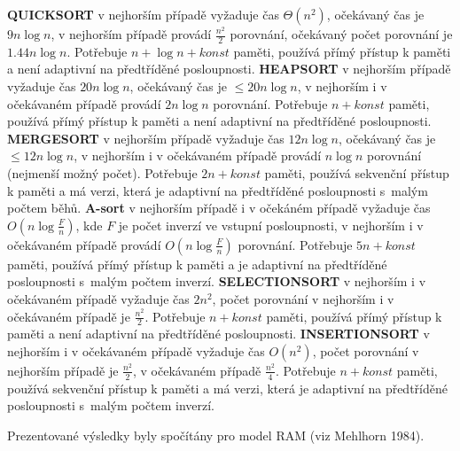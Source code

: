 \documentclass[a4paper,12pt]{article}
\begin{document}
{\bf QUICKSORT} v nejhorším případě vyžaduje čas 
$\Theta (n^2)$, oče\-kávaný čas je $9n\log n$, v 
nej\-horším případě provádí $\frac {n^2}2$ porov\-nání,  
očekávaný počet porov\-nání je $1.44n\log n$. 
Potřebuje $n+\log n+konst$ paměti, používá přímý 
přístup k paměti a není adaptivní na předtříděné 
posloupnosti.\newline 
{\bf HEAPSORT} v nejhorším případě vyžaduje čas $
20n\log n$, 
oče\-kávaný čas je $\le 20n\log n$, v nejhorším i v 
očekávaném případě provádí $2n\log n$ porovnání. 
Potřebuje $n+konst$ paměti, používá přímý přístup k paměti a 
není adaptivní na předtříděné posloupnosti.\newline 
{\bf MERGESORT} v nejhorším případě vyžaduje čas 
$12n\log n$, očekávaný čas je $\le 12n\log n$, v nejhorším 
i v očekáva\-ném případě provádí $n\log n$ 
porovnání (nejmenší možný počet). Potřebuje $
2n+konst$ 
paměti, používá 
sekvenční přístup k paměti a má verzi, která je 
adaptivní na předtříděné posloupnosti s~malým počtem 
běhů.\newline 
{\bf A-sort} v nejhorším případě i v očekáném případě vyžaduje čas 
$O(n\log\frac Fn)$, kde $F$ je počet inverzí ve vstupní 
posloupnosti,  v nejhorším i v očekávaném 
případě provádí $O(n\log\frac Fn)$ porovnání. Potřebuje  
$5n+konst$ paměti, používá přímý přístup k paměti 
a je adaptivní na předtříděné posloupnosti s~malým 
počtem inverzí.\newline 
{\bf SELECTIONSORT} v nejhorším i v očekávaném případě 
vyžaduje čas $2n^2$, počet porov\-nání v nejhorším 
i v očekávaném případě je $\frac {n^2}2$. Potřebuje 
$n+konst$ paměti, používá přímý přístup k paměti a 
není adaptivní na předtříděné posloupnosti.\newline 
{\bf INSERTIONSORT} v nejhorším i v očekávaném případě  
vy\-žaduje čas $O(n^2)$, počet porov\-nání v nejhorším 
případě je $\frac {n^2}2$, v oče\-ká\-vaném případě 
$\frac {n^2}4$. Potřebuje $n+konst$ paměti, použí\-vá 
sekvenční přístup k paměti a má verzi, která je 
adaptivní na předtříděné posloupnosti s~malým počtem 
inverzí.

Prezentované  výsledky byly spočítány 
pro model RAM (viz Mehlhorn 1984).
\end{document}
